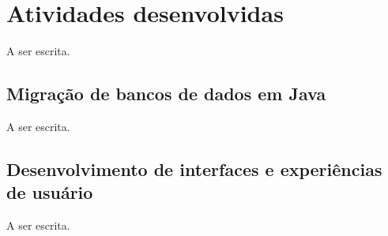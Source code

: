 \chapter{Atividades desenvolvidas}
\label{cap:atividades-desenvolvidas}

A ser escrita.

\section{Migração de bancos de dados em Java}
\label{sec:java-atividades}

A ser escrita.

\section{Desenvolvimento de interfaces e experiências de usuário}
\label{sec:ui-ux-atividades}

A ser escrita.